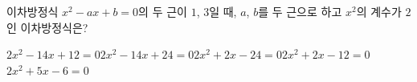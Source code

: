 이차방정식 $x^2-ax+b=0$의 두 근이 $1$, $3$일 때, $a$, $b$를 두 근으로 하고 $x^2$의 계수가 $2$인 이차방정식은? 
\begin{choicesii}{$2x^2-14x+12=0$}{$2x^2-14x+24=0$}{$2x^2+2x-24=0$}{$2x^2+2x-12=0$}{$2x^2+5x-6=0$}\end{choicesii}
